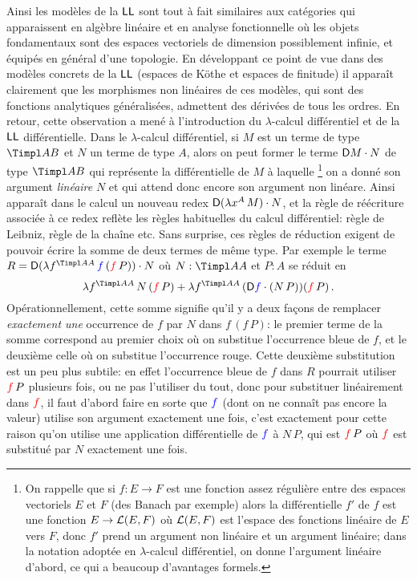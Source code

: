 \documentclass[a4]{article}
\begin{document}
Ainsi les modèles de la $\hbox{\textsf{LL}}$ sont tout à fait similaires aux
catégories qui apparaissent en algèbre linéaire et en analyse
fonctionnelle où les objets fondamentaux sont des espaces vectoriels
de dimension possiblement infinie, et équipés en général d'une
topologie.
%
En développant ce point de vue dans des modèles concrets de la $\hbox{\textsf{LL}}$
(espaces de Köthe et espaces de finitude) il apparaît clairement que
les morphismes non linéaires de ces modèles, qui sont des fonctions
analytiques généralisées, admettent des dérivées de tous les ordres.
%
En retour, cette observation a mené à l'introduction du
$\lambda$-calcul différentiel et de la $\hbox{\textsf{LL}}$ différentielle.
%
Dans le $\lambda$-calcul différentiel, si $M$ est un terme de type
$\Timpl AB$ et $N$ un terme de type $A$, alors on peut former le terme
$\mathsf D{M}\cdot{N}$ de type $\Timpl AB$ qui représente la différentielle de
$M$ à laquelle%
\footnote{On rappelle que si $f:E\to F$ est une fonction assez
  régulière entre des espaces vectoriels $E$ et $F$ (des Banach par
  exemple) alors la différentielle $f'$ de $f$ est une fonction
  $E\to\mathcal{L}(E,F)$ où $\mathcal{L}(E,F)$ est l'espace des fonctions linéaire de
  $E$ vers $F$, donc $f'$ prend un argument non linéaire et un
  argument linéaire; dans la notation adoptée en $\lambda$-calcul
  différentiel, on donne l'argument linéaire d'abord, ce qui a
  beaucoup d'avantages formels.} %
on a donné son argument \emph{linéaire} $N$ et qui attend donc encore
son argument non linéare.
%
Ainsi apparaît dans le calcul un nouveau redex
$\mathsf D{(\lambda x^{A}\,{M})}\cdot{N}$, et la règle de réécriture associée à ce
redex reflète les règles habituelles du calcul différentiel: règle de
Leibniz, règle de la chaîne etc.
%
Sans surprise, ces règles de réduction exigent de pouvoir écrire la
somme de deux termes de même type.
%
Par exemple le terme
$R=\Diffapp{(\Abst f{\Timpl AA}{\BL f\,(\RD f\,P)})}N$ où
$N:\Timpl AA$ et $P:A$ se réduit en
$$
\Abst f{\Timpl AA}{N\,(\RD f\, P)}
+
\Abst f{\Timpl AA}{(\Diffapp{\BL f}{(N\,P)})(\RD f\,P)}\,.
$$
Opérationnellement, cette somme signifie qu'il y a deux façons de
remplacer \emph{exactement une} occurrence de $f$ par $N$ dans
$f\,(f\, P)$: le premier terme de la somme correspond au premier choix
où on substitue l'occurrence bleue de $f$, et le deuxième celle où on
substitue l'occurrence rouge.
%
Cette deuxième substitution est un peu plus subtile: en effet
l'occurrence bleue de $f$ dans $R$ pourrait utiliser ${\color{red}f}\,P$
plusieurs fois, ou ne pas l'utiliser du tout, donc pour substituer
linéairement dans ${\color{red}f}$, il faut d'abord faire en sorte que ${\color{blue}f}$
(dont on ne connaît pas encore la valeur) utilise son argument
exactement une fois, c'est exactement pour cette raison qu'on utilise
une application différentielle de ${\color{blue}f}$ à $N\,P$, qui est ${\color{red}f}\,P$
où ${\color{red}f}$ est substitué par $N$ exactement une fois.
\end{document}
